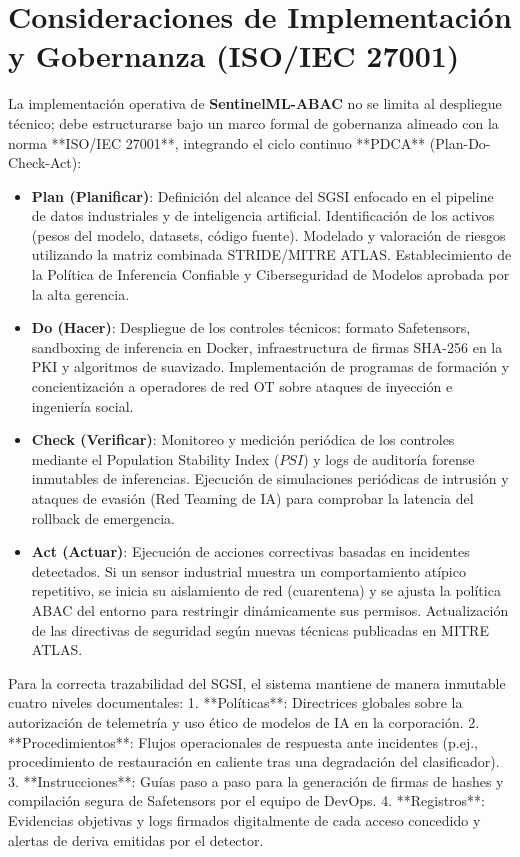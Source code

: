 \documentclass[12pt,letterpaper]{article}
\begin{document}
\section{Consideraciones de Implementación y Gobernanza (ISO/IEC 27001)}

La implementación operativa de \textbf{SentinelML-ABAC} no se limita al despliegue técnico; debe estructurarse bajo un marco formal de gobernanza alineado con la norma **ISO/IEC 27001**, integrando el ciclo continuo **PDCA** (Plan-Do-Check-Act):

\begin{itemize}
    \item   \textbf{Plan (Planificar)}: Definición del alcance del SGSI enfocado en el pipeline de datos industriales y de inteligencia artificial. Identificación de los activos (pesos del modelo, datasets, código fuente). Modelado y valoración de riesgos utilizando la matriz combinada STRIDE/MITRE ATLAS. Establecimiento de la Política de Inferencia Confiable y Ciberseguridad de Modelos aprobada por la alta gerencia.
    \item   \textbf{Do (Hacer)}: Despliegue de los controles técnicos: formato Safetensors, sandboxing de inferencia en Docker, infraestructura de firmas SHA-256 en la PKI y algoritmos de suavizado. Implementación de programas de formación y concientización a operadores de red OT sobre ataques de inyección e ingeniería social.
    \item   \textbf{Check (Verificar)}: Monitoreo y medición periódica de los controles mediante el Population Stability Index ($PSI$) y logs de auditoría forense inmutables de inferencias. Ejecución de simulaciones periódicas de intrusión y ataques de evasión (Red Teaming de IA) para comprobar la latencia del rollback de emergencia.
    \item   \textbf{Act (Actuar)}: Ejecución de acciones correctivas basadas en incidentes detectados. Si un sensor industrial muestra un comportamiento atípico repetitivo, se inicia su aislamiento de red (cuarentena) y se ajusta la política ABAC del entorno para restringir dinámicamente sus permisos. Actualización de las directivas de seguridad según nuevas técnicas publicadas en MITRE ATLAS.
\end{itemize}

Para la correcta trazabilidad del SGSI, el sistema mantiene de manera inmutable cuatro niveles documentales:
1.  **Políticas**: Directrices globales sobre la autorización de telemetría y uso ético de modelos de IA en la corporación.
2.  **Procedimientos**: Flujos operacionales de respuesta ante incidentes (p.ej., procedimiento de restauración en caliente tras una degradación del clasificador).
3.  **Instrucciones**: Guías paso a paso para la generación de firmas de hashes y compilación segura de Safetensors por el equipo de DevOps.
4.  **Registros**: Evidencias objetivas y logs firmados digitalmente de cada acceso concedido y alertas de deriva emitidas por el detector.
\end{document}
